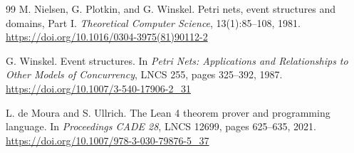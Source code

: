 \documentclass[11pt]{article}
\begin{document}
\begin{thebibliography}{99}
M. Nielsen, G. Plotkin, and G. Winskel.
\newblock Petri nets, event structures and domains, Part I.
\newblock \emph{Theoretical Computer Science}, 13(1):85--108, 1981.
\newblock \url{https://doi.org/10.1016/0304-3975(81)90112-2}

G. Winskel.
\newblock Event structures.
\newblock In \emph{Petri Nets: Applications and Relationships to Other Models of
Concurrency}, LNCS 255, pages 325--392, 1987.
\newblock \url{https://doi.org/10.1007/3-540-17906-2_31}

L. de Moura and S. Ullrich.
\newblock The Lean 4 theorem prover and programming language.
\newblock In \emph{Proceedings CADE 28}, LNCS 12699, pages 625--635, 2021.
\newblock \url{https://doi.org/10.1007/978-3-030-79876-5_37}

\end{thebibliography}
\end{document}
